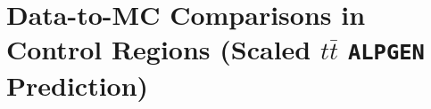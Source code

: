 \section{Data-to-MC Comparisons in Control Regions (Scaled $t\bar{t}$ \texttt{ALPGEN} Prediction)}
\label{app:DataMCControl_ScaledALPGEN}


\clearpage

\clearpage


